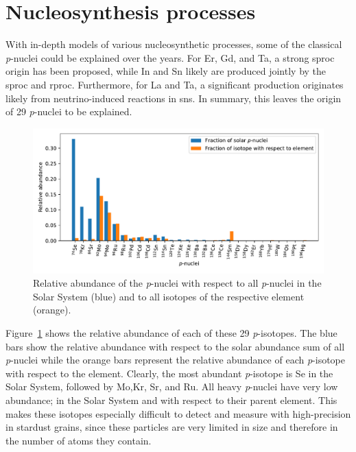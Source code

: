 \section{Nucleosynthesis processes}

With in-depth models of various nucleosynthetic processes, some of the classical \textit{p}-nuclei could be explained over the years. For Er, Gd, and Ta, a strong \ac{sproc} origin has been proposed, while In and Sn likely are produced jointly by the \ac{sproc} and \ac{rproc}. Furthermore, for La and Ta, a significant production originates likely from neutrino-induced reactions in \acp{sn}. In summary, this leaves the origin of 29 \textit{p}-nuclei to be explained.

\begin{figure}[tb]
    \centering
    \includegraphics[width=\textwidth]{graphics/p-nuclei/p-nuclei}
    \caption{Relative abundance of the \textit{p}-nuclei with respect to all \textit{p}-nuclei in the Solar System (blue) and to all isotopes of the respective element (orange).}
    \label{fig:p-nuclei:p-nuclei_abundance_relative}
\end{figure}
Figure~\ref{fig:p-nuclei:p-nuclei_abundance_relative} shows the relative abundance of each of these 29 \textit{p}-isotopes. The blue bars show the relative abundance with respect to the solar abundance sum of all \textit{p}-nuclei while the orange bars represent the relative abundance of each \textit{p}-isotope with respect to the element. Clearly, the most abundant \textit{p}-isotope is Se in the Solar System, followed by Mo,Kr, Sr, and Ru. All heavy \textit{p}-nuclei have very low abundance; in the Solar System and with respect to their parent element. This makes these isotopes especially difficult to detect and measure with high-precision in stardust grains, since these particles are very limited in size and therefore in the number of atoms they contain.

